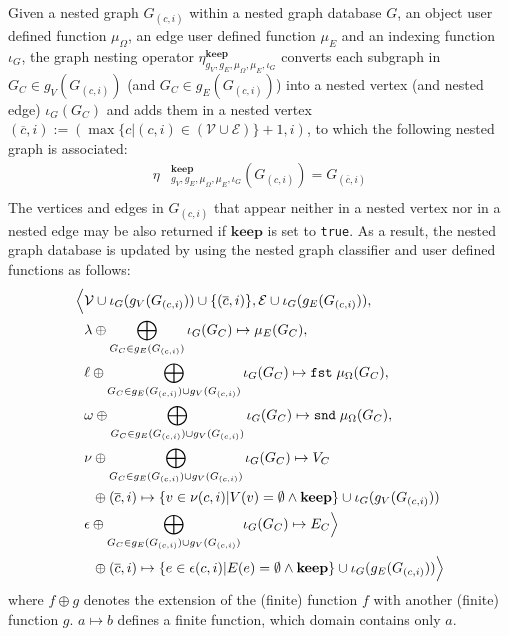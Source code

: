 \begin{definition}
	Given a nested graph $G_{(c,i)}$ within a nested graph database $G$, an object user defined function $\mu_\Omega$, an edge user defined function $\mu_E$ and an indexing function $\iota_G$,
	the graph nesting operator $\eta_{g_V,g_E,\mu_\Omega,\mu_E,\iota_G}^{\textbf{keep}}$ converts each subgraph in $G_C\in g_V(G_{(c,i)})$ (and $G_C\in g_E(G_{(c,i)})$) into a nested vertex (and nested edge) $\iota_G(G_C)$ and adds them in a nested vertex $(\overline{c},i):=(\max\{c|(c,i)\in(\mathcal{V}\cup \mathcal{E})\}+1,i)$, to which the following nested graph is associated:
	\[\begin{split}
	\eta&{}_{g_V,g_E,\mu_\Omega,\mu_E,\iota_G}^{\textbf{keep}}(G_{(c,i)})=G_{(\overline{c},i)}\\
	\end{split}\]
	The vertices and edges in $G_{(c,i)}$ that appear neither in a nested vertex nor in a nested edge may be also returned if $\textbf{keep}$ is set to \texttt{true}. As a result, the nested graph database is updated by using the nested graph classifier and user defined functions as follows:
	\[\begin{split}
	\Big\langle&\mathcal{V}\cup \iota_G(g_V(G_{(c,i)}))\cup\{(\overline{c},i)\}, \mathcal{E}\cup \iota_G(g_E(G_{(c,i)})),\\
	& \lambda\oplus \bigoplus_{G_C\in g_E(G_{(c,i)})}\iota_G(G_C)\mapsto \mu_E(G_C),\\
	& \ell\oplus\bigoplus_{G_C\in g_E(G_{(c,i)})\cup g_V(G_{(c,i)})}\iota_G(G_C)\mapsto\texttt{fst}\;\mu_\Omega(G_C),\\
	& \omega\oplus\bigoplus_{G_C\in g_E(G_{(c,i)})\cup g_V(G_{(c,i)})}\iota_G(G_C)\mapsto\texttt{snd}\;\mu_\Omega(G_C),\\
	& \nu\oplus \bigoplus_{G_C\in g_E(G_{(c,i)})\cup g_V(G_{(c,i)})}\iota_G(G_C)\mapsto V_C\\
	& \;\; \oplus (\overline{c},i)\mapsto \{v\in \nu(c,i) | V(v)=\emptyset\wedge\textbf{keep} \}\cup \iota_G(g_V(G_{(c,i)})) \\
	& \epsilon\oplus \bigoplus_{G_C\in g_E(G_{(c,i)})\cup g_V(G_{(c,i)})}\iota_G(G_C)\mapsto E_C\Big\rangle\\
	& \;\; \oplus (\overline{c},i)\mapsto\{e\in \epsilon(c,i) | E(e)=\emptyset\wedge\textbf{keep} \}\cup \iota_G(g_E(G_{(c,i)}))\Big\rangle
	\end{split}\]
	where $f\oplus g$ denotes the extension of the (finite) function $f$ with another (finite) function $g$. $a\mapsto b$ defines a finite function, which domain contains only $a$.
\end{definition}


